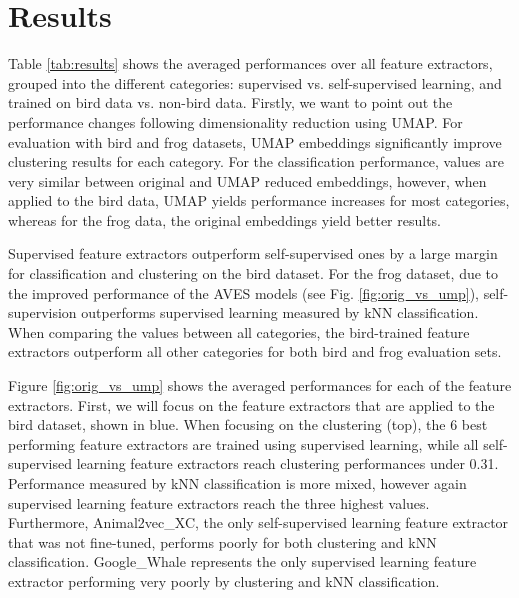 \section{Results}
\label{sec:results}



Table \ref{tab:results} shows the averaged performances over all feature extractors, grouped into the different categories: supervised vs. self-supervised learning, and trained on bird data vs. non-bird data.
Firstly, we want to point out the performance changes following dimensionality reduction using UMAP.
For evaluation with bird and frog datasets, UMAP embeddings significantly improve clustering results for each category.
For the classification performance, values are very similar between original and UMAP reduced embeddings, however, when applied to the bird data, UMAP yields performance increases for most categories, whereas for the frog data, the original embeddings yield better results.

Supervised feature extractors outperform self-supervised ones by a large margin for classification and clustering on the bird dataset.
For the frog dataset, due to the improved performance of the AVES models (see Fig. \ref{fig:orig_vs_ump}), self-supervision outperforms supervised learning measured by kNN classification.
When comparing the values between all categories, the bird-trained feature extractors outperform all other categories for both bird and frog evaluation sets.




Figure \ref{fig:orig_vs_ump} shows the averaged performances for each of the feature extractors.
First, we will focus on the feature extractors that are applied to the bird dataset, shown in blue.
When focusing on the clustering (top), the 6 best performing feature extractors are trained using supervised learning, while all self-supervised learning feature extractors reach clustering performances under 0.31.
Performance measured by kNN classification is more mixed, however again supervised learning feature extractors reach the three highest values.
Furthermore, Animal2vec\_XC, the only self-supervised learning feature extractor that was not fine-tuned, performs poorly for both clustering and kNN classification.
Google\_Whale represents the only supervised learning feature extractor performing very poorly by clustering and kNN classification.

